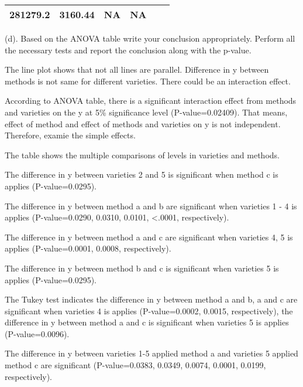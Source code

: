 \documentclass[]{article}
\begin{document}
\begin{longtable}[]{@{}cllllc@{}}
\begin{minipage}[t]{0.10\columnwidth}
281279.2\strut
\end{minipage} & \begin{minipage}[t]{0.12\columnwidth}\raggedright
3160.44\strut
\end{minipage} & \begin{minipage}[t]{0.12\columnwidth}\raggedright
NA\strut
\end{minipage} & \begin{minipage}[t]{0.14\columnwidth}\centering
NA\strut
\end{minipage}\tabularnewline
\bottomrule
\end{longtable}

(d).
\textcolor[rgb]{0.5,0.5,0.5}{Based on the ANOVA table write your conclusion appropriately. Perform all the necessary tests and report the conclusion along with the p-value.}

The line plot shows that not all lines are parallel. Difference in y
between methods is not same for different varieties. There could be an
interaction effect.

According to ANOVA table, there is a significant interaction effect from
methods and varieties on the y at 5\% significance level
(P-value=0.02409). That means, effect of method and effect of methods
and varieties on y is not independent. Therefore, examie the simple
effects.

The table shows the multiple comparisons of levels in varieties and
methods.

The difference in y between varieties 2 and 5 is significant when method
c is applies (P-value=0.0295).

The difference in y between method a and b are significant when
varieties 1 - 4 is applies (P-value=0.0290, 0.0310, 0.0101,
\textless{}.0001, respectively).

The difference in y between method a and c are significant when
varieties 4, 5 is applies (P-value=0.0001, 0.0008, respectively).

The difference in y between method b and c is significant when varieties
5 is applies (P-value=0.0295).

The Tukey test indicates the difference in y between method a and b, a
and c are significant when varieties 4 is applies (P-value=0.0002,
0.0015, respectively), the difference in y between method a and c is
significant when varieties 5 is applies (P-value=0.0096).

The difference in y between varieties 1-5 applied method a and varieties
5 applied method c are significant (P-value=0.0383, 0.0349, 0.0074,
0.0001, 0.0199, respectively).
\end{document}
